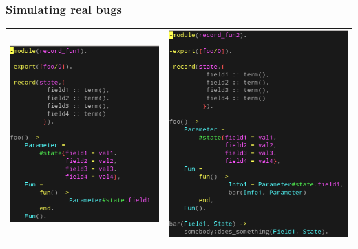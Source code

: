 \begin{frame}
\frametitle{Simulating real bugs}

\begin{center}
\begin{tabular}{ c c }
  	\includegraphics[scale=0.4]{../figures/rec_fun1}
&
	\includegraphics[scale=0.4]{../figures/rec_fun2}
\end{tabular}
\end{center}
\end{frame}
